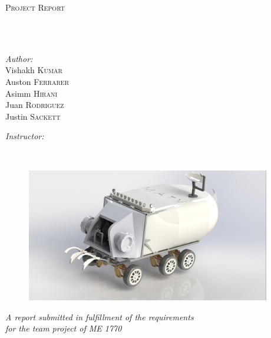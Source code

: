 \begin{titlepage}
 \begin{center}

 \vspace*{.06\textheight}
 {\scshape\LARGE \univname\par}\vspace{0.1cm} %
 \textsc{\Large Project Report}\\[0.5cm] %
 \HRule \\[0.4cm] %
 {\huge \bfseries \ttitle\par}\vspace{0.4cm} %
 \HRule \\[1.5cm] %

 \begin{minipage}[t]{0.4\textwidth}
 \begin{flushleft} \large
 \emph{Author:}\\
 {
Vishakh \textsc{Kumar} \\
Auston \textsc{Ferrarer}  \\
Asimm \textsc{Hirani}  \\
Juan \textsc{Rodriguez}  \\
Justin \textsc{Sackett}  \\
} %
 \end{flushleft}
 \end{minipage}
 \begin{minipage}[t]{0.4\textwidth}
 \begin{flushright} \large
 \emph{Instructor:} \\
 \href{http://www.me.gatech.edu/faculty/pucha}{\supname} %
 \end{flushright}
 \end{minipage}\\[1cm]
\begin{figure}[!ht] 
\centering
\includegraphics[width=0.95\textwidth]{a-0-1-TitlePage/FinalRender.JPG}
\end{figure}
 \large \textit{A report submitted in fulfillment of the requirements\\ for the team project of ME 1770}\\[0.3cm] %

 \end{center}
 \end{titlepage}
\clearpage
